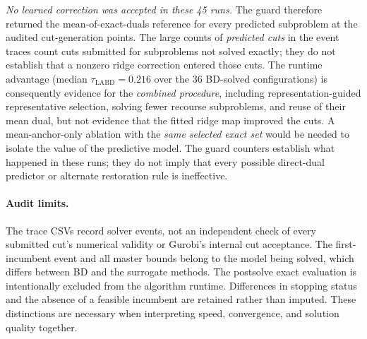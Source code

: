 \emph{No learned correction was accepted in these 45 runs.} The guard therefore returned the mean-of-exact-duals reference for every predicted subproblem at the audited cut-generation points. The large counts of \emph{predicted cuts} in the event traces count cuts submitted for subproblems not solved exactly; they do not establish that a nonzero ridge correction entered those cuts. The runtime advantage (median $\tau_{\mathrm{LABD}}=0.216$ over the 36 BD-solved configurations) is consequently evidence for the \emph{combined procedure}, including representation-guided representative selection, solving fewer recourse subproblems, and reuse of their mean dual, but not evidence that the fitted ridge map improved the cuts. A mean-anchor-only ablation with the \emph{same selected exact set} would be needed to isolate the value of the predictive model. The guard counters establish what happened in these runs; they do not imply that every possible direct-dual predictor or alternate restoration rule is ineffective.

\paragraph{Audit limits.}
The trace CSVs record solver events, not an independent check of every submitted cut's numerical validity or Gurobi's internal cut acceptance. The first-incumbent event and all master bounds belong to the model being solved, which differs between BD and the surrogate methods. The postsolve exact evaluation is intentionally excluded from the algorithm runtime. Differences in stopping status and the absence of a feasible incumbent are retained rather than imputed. These distinctions are necessary when interpreting speed, convergence, and solution quality together.
